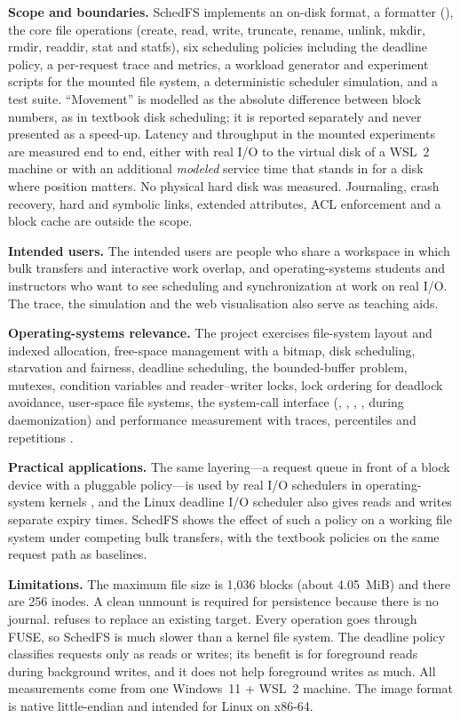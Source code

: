 \documentclass[12pt,a4paper]{article}
\DeclareRobustCommand{\code}[1]{\texttt{\detokenize{#1}}}
\begin{document}
\textbf{Scope and boundaries.} SchedFS implements an on-disk format, a formatter (\code{mkfs.schedfs}), the core file operations (create, read, write, truncate, rename, unlink, mkdir, rmdir, readdir, stat and statfs), six scheduling policies including the deadline policy, a per-request trace and metrics, a workload generator and experiment scripts for the mounted file system, a deterministic scheduler simulation, and a test suite. ``Movement'' is modelled as the absolute difference between block numbers, as in textbook disk scheduling; it is reported separately and never presented as a speed-up. Latency and throughput in the mounted experiments are measured end to end, either with real \code{O_DIRECT} I/O to the virtual disk of a WSL~2 machine or with an additional \emph{modeled} service time that stands in for a disk where position matters. No physical hard disk was measured. Journaling, crash recovery, hard and symbolic links, extended attributes, ACL enforcement and a block cache are outside the scope.

\textbf{Intended users.} The intended users are people who share a workspace in which bulk transfers and interactive work overlap, and operating-systems students and instructors who want to see scheduling and synchronization at work on real I/O. The trace, the simulation and the web visualisation also serve as teaching aids.

\textbf{Operating-systems relevance.} The project exercises file-system layout and indexed allocation, free-space management with a bitmap, disk scheduling, starvation and fairness, deadline scheduling, the bounded-buffer problem, mutexes, condition variables and reader--writer locks, lock ordering for deadlock avoidance, user-space file systems, the system-call interface (\code{open}, \code{pread}, \code{pwrite}, \code{fsync}, \code{fork} during daemonization) and performance measurement with traces, percentiles and repetitions \cite{silberschatz2018,arpaci2018,kerrisk2010}.

\textbf{Practical applications.} The same layering---a request queue in front of a block device with a pluggable policy---is used by real I/O schedulers in operating-system kernels \cite{worthington1994}, and the Linux deadline I/O scheduler also gives reads and writes separate expiry times. SchedFS shows the effect of such a policy on a working file system under competing bulk transfers, with the textbook policies on the same request path as baselines.

\textbf{Limitations.} The maximum file size is 1{,}036 blocks (about 4.05~MiB) and there are 256 inodes. A clean unmount is required for persistence because there is no journal. \code{rename} refuses to replace an existing target. Every operation goes through FUSE, so SchedFS is much slower than a kernel file system. The deadline policy classifies requests only as reads or writes; its benefit is for foreground reads during background writes, and it does not help foreground writes as much. All measurements come from one Windows~11 + WSL~2 machine. The image format is native little-endian and intended for Linux on x86-64.
\end{document}
